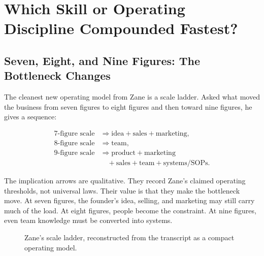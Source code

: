 \documentclass[11pt,oneside]{book}
\begin{document}
\chapter{Which Skill or Operating Discipline Compounded Fastest?}

\section{Seven, Eight, and Nine Figures: The Bottleneck Changes}

The cleanest new operating model from Zane is a scale ladder. Asked what moved the business from seven figures to eight figures and then toward nine figures, he gives a sequence:

\begin{align}
7\text{-figure scale}&\Rightarrow\text{idea}+\text{sales}+\text{marketing},\\
8\text{-figure scale}&\Rightarrow\text{team},\\
9\text{-figure scale}&\Rightarrow\text{product}+\text{marketing}\\
&\quad+\text{sales}+\text{team}+\text{systems/SOPs}.
\end{align}

The implication arrows are qualitative. They record Zane's claimed operating thresholds, not universal laws. Their value is that they make the bottleneck move. At seven figures, the founder's idea, selling, and marketing may still carry much of the load. At eight figures, people become the constraint. At nine figures, even team knowledge must be converted into systems.

\begin{figure}
\centering
{}
\caption{Zane's scale ladder, reconstructed from the transcript as a compact operating model.}
\end{figure}
\end{document}

